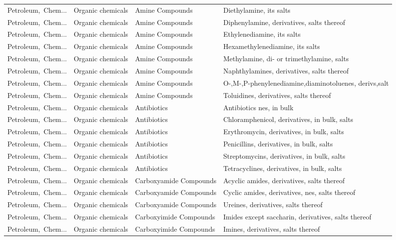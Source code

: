 \begin{appendices}
\begin{xltabular}{\textwidth}{|p{0.10\textwidth}|p{0.25\textwidth}|p{0.24\textwidth}|p{0.31\textwidth}|}
Petroleum,\ Chem... & Organic chemicals & Amine Compounds & Diethylamine, its salts \\
Petroleum,\ Chem... & Organic chemicals & Amine Compounds & Diphenylamine, derivatives, salts thereof \\
Petroleum,\ Chem... & Organic chemicals & Amine Compounds & Ethylenediamine, its salts \\
Petroleum,\ Chem... & Organic chemicals & Amine Compounds & Hexamethylenediamine, its salts \\
Petroleum,\ Chem... & Organic chemicals & Amine Compounds & Methylamine, di- or trimethylamine, salts \\
Petroleum,\ Chem... & Organic chemicals & Amine Compounds & Naphthylamines, derivatives, salts thereof \\
Petroleum,\ Chem... & Organic chemicals & Amine Compounds & O-,M-,P-phenylenediamine,diaminotoluenes, derivs,salt \\
Petroleum,\ Chem... & Organic chemicals & Amine Compounds & Toluidines, derivatives, salts thereof \\
Petroleum,\ Chem... & Organic chemicals & Antibiotics & Antibiotics nes, in bulk \\
Petroleum,\ Chem... & Organic chemicals & Antibiotics & Chloramphenicol, derivatives, in bulk, salts \\
Petroleum,\ Chem... & Organic chemicals & Antibiotics & Erythromycin, derivatives, in bulk, salts \\
Petroleum,\ Chem... & Organic chemicals & Antibiotics & Penicillins, derivatives, in bulk, salts \\
Petroleum,\ Chem... & Organic chemicals & Antibiotics & Streptomycins, derivatives, in bulk, salts \\
Petroleum,\ Chem... & Organic chemicals & Antibiotics & Tetracyclines, derivatives, in bulk, salts \\
Petroleum,\ Chem... & Organic chemicals & Carboxyamide Compounds & Acyclic amides, derivatives, salts thereof \\
Petroleum,\ Chem... & Organic chemicals & Carboxyamide Compounds & Cyclic amides, derivatives, nes, salts thereof \\
Petroleum,\ Chem... & Organic chemicals & Carboxyamide Compounds & Ureines, derivatives, salts thereof \\
Petroleum,\ Chem... & Organic chemicals & Carboxyimide Compounds & Imides except saccharin, derivatives, salts thereof \\
Petroleum,\ Chem... & Organic chemicals & Carboxyimide Compounds & Imines, derivatives, salts thereof \\

\end{xltabular}
\end{appendices}
